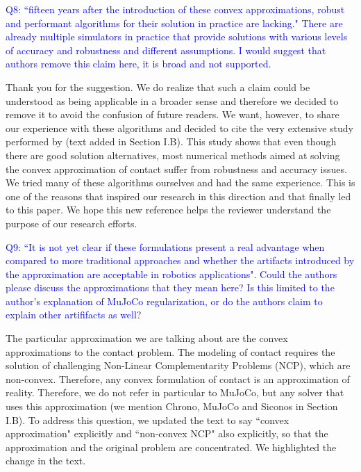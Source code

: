 \textcolor{blue}{Q8: ``fifteen years after the introduction of these convex
approximations, robust and performant algorithms for their solution in practice
are lacking." There are already multiple simulators in practice that provide
solutions with various levels of accuracy and robustness and different
assumptions. I would suggest that authors remove this claim here, it is broad
and not supported.}

Thank you for the suggestion. We do realize that such a claim could be
understood as being applicable in a broader sense and therefore we decided to
remove it to avoid the confusion of future readers. We want, however, to share
our experience with these algorithms and decided to cite the very extensive
study performed by \cite{bib:acary2018solving} (text added in Section I.B). This
study shows that even though there are good solution alternatives, most
numerical methods aimed at solving the convex approximation of contact suffer
from robustness and accuracy issues. We tried many of these algorithms ourselves
and had the same experience. This is one of the reasons that inspired our
research in this direction and that finally led to this paper. We hope this new
reference helps the reviewer understand the purpose of our research efforts.
\vspace{5mm}

\textcolor{blue}{Q9: ``It is not yet clear if these formulations present a real
advantage when compared to more traditional approaches and whether the artifacts
introduced by the approximation are acceptable in robotics applications". Could
the authors please discuss the approximations that they mean here? Is this
limited to the author's explanation of MuJoCo regularization, or do the authors
claim to explain other artififacts as well?}

The particular approximation we are talking about are the convex approximations
to the contact problem. The modeling of contact requires the solution of
challenging Non-Linear Complementarity Problems (NCP), which are non-convex.
Therefore, any convex formulation of contact is an approximation of reality.
Therefore, we do not refer in particular to MuJoCo, but any solver that uses
this approximation (we mention Chrono, MuJoCo and Siconos in Section I.B).
To address this question, we updated the text to say ``convex approximation"
explicitly and ``non-convex NCP" also explicitly, so that the approximation
and the original problem are concentrated. We highlighted the change in the
text.
